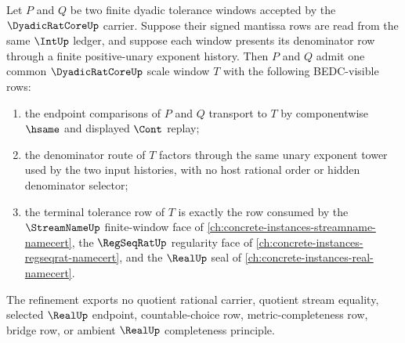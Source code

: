 \begin{theorem}
\label{thm:dyadicratcore-common-scale-terminal-refinement}
Let $P$ and $Q$ be two finite dyadic tolerance windows accepted by the $\DyadicRatCoreUp$ carrier. Suppose their signed mantissa rows are read from the same $\IntUp$ ledger, and suppose each window presents its denominator row through a finite positive-unary exponent history. Then $P$ and $Q$ admit one common $\DyadicRatCoreUp$ scale window $T$ with the following BEDC-visible rows:
\begin{enumerate}
\item the endpoint comparisons of $P$ and $Q$ transport to $T$ by componentwise $\hsame$ and displayed $\Cont$ replay;
\item the denominator route of $T$ factors through the same unary exponent tower used by the two input histories, with no host rational order or hidden denominator selector;
\item the terminal tolerance row of $T$ is exactly the row consumed by the $\StreamNameUp$ finite-window face of \autoref{ch:concrete-instances-streamname-namecert}, the $\RegSeqRatUp$ regularity face of \autoref{ch:concrete-instances-regseqrat-namecert}, and the $\RealUp$ seal of \autoref{ch:concrete-instances-real-namecert}.
\end{enumerate}
The refinement exports no quotient rational carrier, quotient stream equality, selected $\RealUp$ endpoint, countable-choice row, metric-completeness row, bridge row, or ambient $\RealUp$ completeness principle.
\end{theorem}
